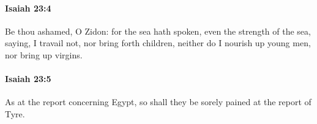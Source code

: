 		\paragraph{Isaiah 23:4} %
			\label{ISAIAH-23-4}

			Be thou ashamed, O Zidon: for the sea hath spoken, even the strength of the sea, saying, I travail not, nor bring forth children, neither do I nourish up young men, nor bring up virgins.


		\paragraph{Isaiah 23:5} %
			\label{ISAIAH-23-5}

			As at the report concerning Egypt, so shall they be sorely pained at the report of Tyre.


